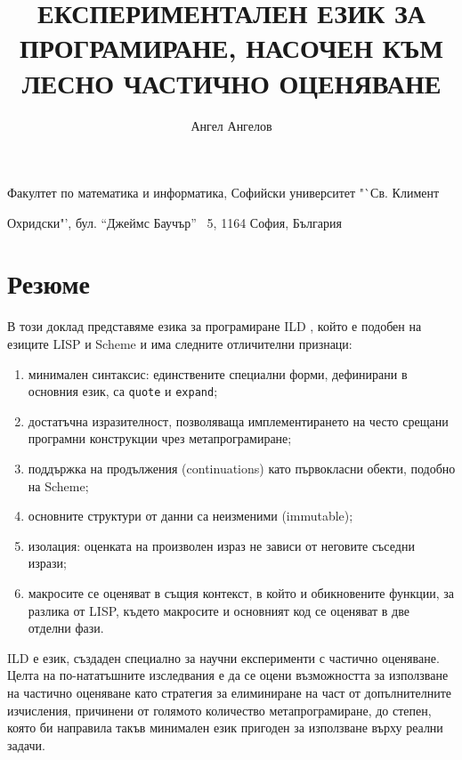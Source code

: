 \documentclass[11pt,a4paper]{amsart}
\title{\MakeUppercase{експериментален език за програмиране, насочен към лесно частично оценяване}}
\author[angel]{Ангел Ангелов}
\theoremstyle{definition}
\begin{document}
\newcommand\FMI{Факултет по математика и информатика,
Софийски университет "`Св. Климент\par Охридски"',
бул. "`Джеймс Баучър"' \No~5, 1164 София, България}

\newcommand\NSF{Фонд "`Научни изследвания"' при МОН\xspace}

\newcommand\SUF{Фонд "`Научни изследвания"' при СУ "`Св. Климент Охридски"'\xspace}

\renewcommand\emailaddrname{{\itshape E-mail}}

\newcommand\lang{ILD }

\maketitle
\begin{center}
\FMI
\end{center}

\thispagestyle{empty}

\bigskip

\section*{Резюме%
}

\bigskip

В този доклад представяме езика за програмиране \lang, който е подобен на
езиците LISP и Scheme и има следните отличителни признаци:

\begin{enumerate}
    \item минимален синтаксис: единствените специални форми, дефинирани в основния
    език, са \texttt{quote} и \texttt{expand};
    \item достатъчна изразителност, позволяваща имплементирането на често срещани програмни
    конструкции чрез метапрограмиране;
    \item поддържка на продължения (continuations) като първокласни обекти, подобно на Scheme;
    \item\label{immutable} основните структури от данни са неизменими (immutable);
    \item\label{isolatedsiblings} изолация: оценката на произволен
    израз не зависи от неговите съседни изрази;
    \item\label{runtimemacros} макросите се оценяват в същия контекст, в който и обикновените
    функции, за разлика от LISP, където макросите и основният код се оценяват в две отделни фази.
\end{enumerate}

\lang е език, създаден специално за научни експерименти с частично оценяване.
Целта на по-нататъшните изследвания е да се оцени възможността за използване
на частично оценяване като стратегия за елиминиране на част от допълнителните изчисления,
причинени от голямото количество метапрограмиране, до степен, която би направила
такъв минимален език пригоден за използване върху реални задачи.

\bigskip
\end{document}
